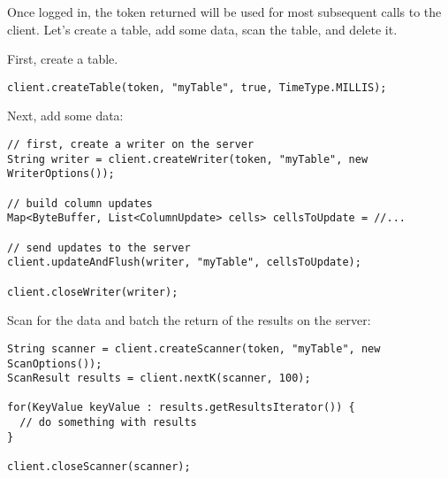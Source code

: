Once logged in, the token returned will be used for most subsequent calls to the client.
Let's create a table, add some data, scan the table, and delete it.


First, create a table.

\begingroup\fontsize{8pt}{8pt}\selectfont\begin{verbatim}
client.createTable(token, "myTable", true, TimeType.MILLIS);
\end{verbatim}\endgroup


Next, add some data:

\begingroup\fontsize{8pt}{8pt}\selectfont\begin{verbatim}
// first, create a writer on the server
String writer = client.createWriter(token, "myTable", new WriterOptions());

// build column updates
Map<ByteBuffer, List<ColumnUpdate> cells> cellsToUpdate = //...

// send updates to the server
client.updateAndFlush(writer, "myTable", cellsToUpdate);

client.closeWriter(writer);
\end{verbatim}\endgroup


Scan for the data and batch the return of the results on the server:

\begingroup\fontsize{8pt}{8pt}\selectfont\begin{verbatim}
String scanner = client.createScanner(token, "myTable", new ScanOptions());
ScanResult results = client.nextK(scanner, 100);

for(KeyValue keyValue : results.getResultsIterator()) {
  // do something with results
}

client.closeScanner(scanner);
\end{verbatim}
\normalsize
